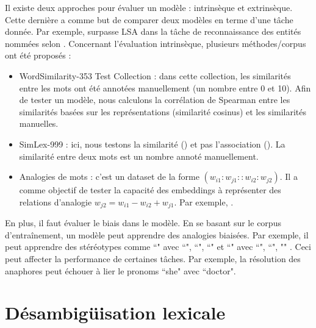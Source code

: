 \documentclass{KodeBook}
\begin{document}
Il existe deux approches pour évaluer un modèle : intrinsèque et extrinsèque. 
Cette dernière a comme but de comparer deux modèles en terme d'une tâche donnée.
Par exemple,  surpasse LSA dans la tâche de reconnaissance des entités nommées selon \citet{2014-pennington-al}. 
Concernant l'évaluation intrinsèque, plusieurs méthodes/corpus ont été proposés : 
\begin{itemize}
	\item  WordSimilarity-353 Test Collection \cite{2002-finkelstein-al} : dans cette collection, les similarités entre les mots ont été annotées manuellement (un nombre entre 0 et 10). 
	Afin de tester un modèle, nous calculons la corrélation de Spearman entre les similarités basées sur les représentations (similarité cosinus) et les similarités manuelles.
	
	\item SimLex-999 \cite{2015-hill-al} : ici, nous testons la similarité () et pas l'association ().
	La similarité entre deux mots est un nombre annoté manuellement.
	
	\item Analogies de mots \cite{2013-mikolov-al2} : c'est un dataset de la forme $(w_{i1}:w_{j1} :: w_{i2}:w_{j2})$. 
	Il a comme objectif de tester la capacité des embeddings à représenter des relations d'analogie $w_{j2} = w_{i1} - w_{i2} + w_{j1}$.
	Par exemple, .
\end{itemize}


En plus, il faut évaluer le biais dans le modèle. 
En se basant sur le corpus d'entraînement, un modèle peut apprendre des analogies biaisées. 
Par exemple, il peut apprendre des stéréotypes comme ``" avec ``", ``", ``" et ``" avec ``", ``", "" \cite{2017-caliskan-al}. 
Ceci peut affecter la performance de certaines tâches.
Par exemple, la résolution des anaphores peut échouer à lier le pronoms ``she" avec ``doctor".

\section{Désambigüisation lexicale}
\end{document}
